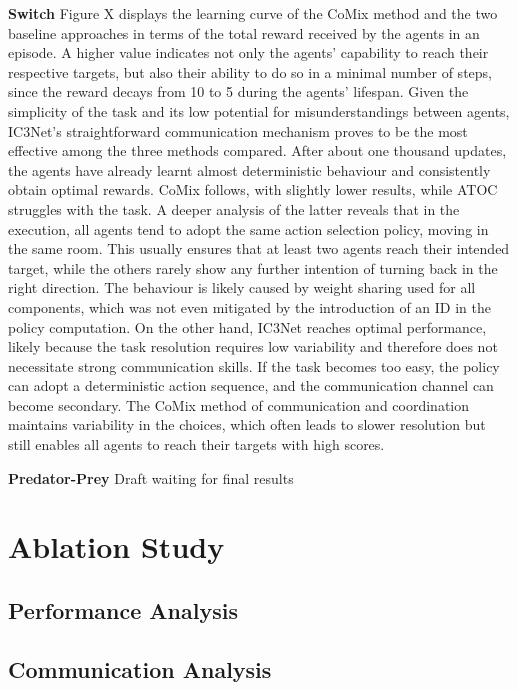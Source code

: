 \documentclass[a4paper,singleside,12pt]{report} %
\begin{document}
\textbf{Switch} Figure X displays the learning curve of the CoMix method and the two baseline approaches in terms of the total reward received by the agents in an episode. A higher value indicates not only the agents' capability to reach their respective targets, but also their ability to do so in a minimal number of steps, since the reward decays from 10 to 5 during the agents' lifespan.
Given the simplicity of the task and its low potential for misunderstandings between agents, IC3Net's straightforward communication mechanism proves to be the most effective among the three methods compared. After about one thousand updates, the agents have already learnt almost deterministic behaviour and consistently obtain optimal rewards. CoMix follows, with slightly lower results, while ATOC struggles with the task. A deeper analysis of the latter reveals that in the execution, all agents tend to adopt the same action selection policy, moving in the same room. This usually ensures that at least two agents reach their intended target, while the others rarely show any further intention of turning back in the right direction. The behaviour is likely caused by weight sharing used for all components, which was not even mitigated by the introduction of an ID in the policy computation. On the other hand, IC3Net reaches optimal performance, likely because the task resolution requires low variability and therefore does not necessitate strong communication skills. If the task becomes too easy, the policy can adopt a deterministic action sequence, and the communication channel can become secondary. The CoMix method of communication and coordination maintains variability in the choices, which often leads to slower resolution but still enables all agents to reach their targets with high scores.

\textbf{Predator-Prey} 
Draft waiting for final results


\section{Ablation Study}\label{ablation}


  \subsection{Performance Analysis}\label{analisis}

  \subsection{Communication Analysis}\label{analisis}
\end{document}
